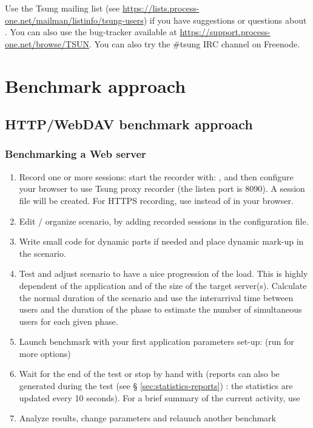 \documentclass{TSUNG-en}
\begin{document}
Use the Tsung mailing list (see
\url{https://lists.process-one.net/mailman/listinfo/tsung-users}) if you have
suggestions or questions about . You can also use the
bug-tracker available at \url{https://support.process-one.net/browse/TSUN}.
You can also try the \#tsung IRC channel on Freenode.

\section{Benchmark approach}

\subsection{HTTP/WebDAV benchmark approach}

\subsubsection{Benchmarking a Web server}

\begin{enumerate}
\item Record one or more sessions: start the recorder with:
  , and then configure your browser to use Tsung
  proxy recorder (the listen port is 8090). A session file will be
  created. For HTTPS recording, use  instead of
     in your browser.
\item Edit / organize scenario, by adding recorded sessions in the
  configuration file.
\item Write small code for dynamic parts if needed and place dynamic mark-up
in the scenario.
\item Test and adjust scenario to have a nice progression of the load. This
is highly dependent of the application and of the size of the target
server(s). Calculate the normal duration of the scenario and use the
interarrival time between users and the duration of the phase to estimate
the number of simultaneous users for each given phase.
\item Launch benchmark with your first application parameters set-up:
   (run  for more options)
\item Wait for the end of the test or stop by hand with
   (reports can also be generated during the
  test (see § \ref{sec:statistics-reports}) : the statistics are
  updated every 10 seconds). For a brief summary of the current
  activity, use 
\item Analyze results, change parameters and relaunch another benchmark
\end{enumerate}
\end{document}
